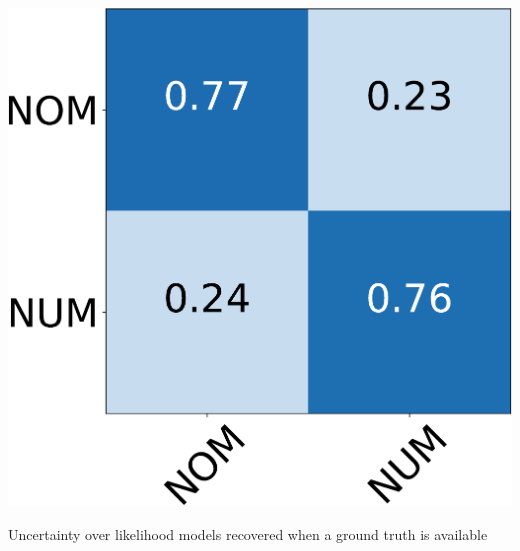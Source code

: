 \documentclass[xcolor={usenames,dvipsnames,svgnames}, compress, aspectratio=169, 11pt]{beamer}
\begin{document}
\begin{frame}[t, htt=bgrey2]
\begin{minipage}[t]{0.5\linewidth}
    \includegraphics[width=.5\linewidth]{figures/disc-type-conf-mat-crop}\\
  \end{minipage}\hfill\begin{minipage}[t]{0.3\linewidth}
    \vspace{-150pt}
    Uncertainty over likelihood models recovered when a ground truth is available
    
  \end{minipage}\hfill\begin{minipage}[t]{0.3\linewidth}
    \vspace{-150pt}
    
  \end{minipage}
  
\end{frame}
\end{document}
